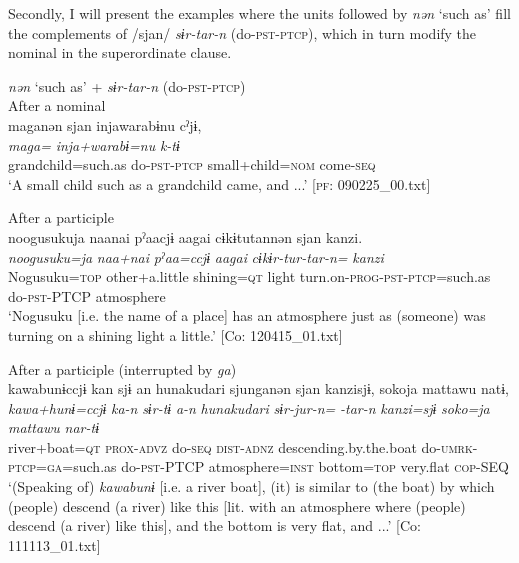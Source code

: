   Secondly, I will present the examples where the units followed by \textit{nən} ‘such as’ fill the complements of /sjan/ \textit{sɨr-tar-n} (do-\textsc{pst}-\textsc{ptcp}), which in turn modify the nominal in the superordinate clause.

\ea\label{ex:10.86}   \textit{nən} ‘such as’ + \textit{sɨr-tar-n} (do-\textsc{pst}-\textsc{ptcp})\\
  \ea After a nominal\\
      \glll    maganən  sjan  injawarabɨnu  cˀjɨ,\\
    \textit{maga=}  \textit{}  \textit{inja+warabɨ=nu}  \textit{k-tɨ}\\
    grandchild=such.as  do-\textsc{pst}-\textsc{ptcp}  small+child=\textsc{nom}  come-\textsc{seq}\\
    \glt     ‘A small child such as a grandchild came, and ...’ [\textsc{pf}: 090225\_00.txt]

  \ex After a participle\\

      \glll    noogusukuja  naanai  pˀaacjɨ  aagai  cɨkɨtutannən  sjan  {\textbar}kanzi{\textbar}.\\
    \textit{noogusuku=ja}  \textit{naa+nai}  \textit{pˀaa=ccjɨ}  \textit{aagai}  \textit{cɨkɨr-tur-tar-n=}  \textit{}  \textit{kanzi}\\
    Nogusuku=\textsc{top}  other+a.little  shining=\textsc{qt}  light turn.on-\textsc{prog}-\textsc{pst}-\textsc{ptcp}=such.as  do-\textsc{pst}-PTCP  atmosphere\\
\glt     ‘Nogusuku [i.e. the name of a place] has an atmosphere just as (someone) was turning on a shining light a little.’  [Co: 120415\_01.txt]

  \ex After a participle (interrupted by \textit{ga})\\

      \glll    {\textbar}kawa{\textbar}bunɨccjɨ  kan  sjɨ  an  {\textbar}hunakudari{\textbar}  sjunganən  sjan  {\textbar}kanzi{\textbar}sjɨ,  {\textbar}soko{\textbar}ja   mattawu  natɨ,\\
    \textit{kawa+hunɨ=ccjɨ}  \textit{ka-n}  \textit{sɨr-tɨ}  \textit{a-n}  \textit{hunakudari}  \textit{sɨr-jur-n=}  \textit{-tar-n}  \textit{kanzi=sjɨ}  \textit{soko=ja}  \textit{mattawu}  \textit{nar-tɨ}\\
    river+boat=\textsc{qt}  \textsc{prox}-\textsc{advz}  do-\textsc{seq}  \textsc{dist}-\textsc{adnz}  descending.by.the.boat do-\textsc{umrk}-\textsc{ptcp}=\textsc{ga}=such.as  do-\textsc{pst}-PTCP  atmosphere=\textsc{inst}  bottom=\textsc{top}  very.flat  \textsc{cop}-SEQ    \\
    \glt     ‘(Speaking of) \textit{kawabunɨ} [i.e. a river boat], (it) is similar to (the boat) by which (people) descend (a river) like this [lit. with an atmosphere where (people) descend (a river) like this], and the bottom is very flat, and ...’  [Co: 111113\_01.txt]
    \z
\z

